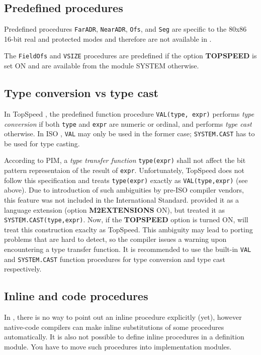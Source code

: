 \subsection{Predefined procedures}

     Predefined procedures \verb'FarADR', \verb'NearADR', \verb'Ofs', and 
     \verb'Seg' are specific to the 80x86 16-bit real and protected modes
     and therefore are not available in \XDS{}.

     The \verb'FieldOfs' and \verb'VSIZE' procedures are predefined if the
     option {\bf TOPSPEED} is set ON and are available from the module SYSTEM
     otherwise.

\subsection{Type conversion vs type cast}

     In TopSpeed \mt{}, the predefined function procedure 
     \verb'VAL(type, expr)' performs {\em type conversion} if both \verb'type'
     and \verb'expr' are numeric or ordinal, and performs {\em type cast}
     otherwise. In ISO \mt{}, \verb'VAL' may only be used in the former case;
     \verb'SYSTEM.CAST' has to be used for type casting.

     According to PIM, a {\em type transfer function} \verb'type(expr)' shall 
     not affect the bit pattern representaion of the result of \verb'expr'.
     Unfortunately, TopSpeed does not follow this specification and treats
     \verb'type(expr)' exactly as \verb'VAL(type,expr)' (see above).
     Due to introduction of such ambiguities by pre-ISO compiler vendors, 
     this feature was not included in the International Standard. 
     \xds{} provided it as a language extension (option 
     {\bf M2EXTENSIONS} ON), but treated it as \verb'SYSTEM.CAST(type,expr)'.
     Now, if the {\bf TOPSPEED} option is turned ON, \xds{} will treat this
     construction exaclty as TopSpeed. This ambiguity may lead to porting 
     problems that are hard to detect, so the compiler issues a warning
     upon encountering a type transfer function.
     It is recommended to use the built-in \verb'VAL' and \verb'SYSTEM.CAST' 
     function procedures for type conversion and type cast respectively. 

\subsection{Inline and code procedures}

    In \xds{}, there is no way to point out an inline procedure explicitly 
    (yet), however native-code compilers can make inline substitutions of 
    some procedures automatically. It is also not possible to define inline
    procedures in a definition module. You have to move such procedures
    into implementation modules.

